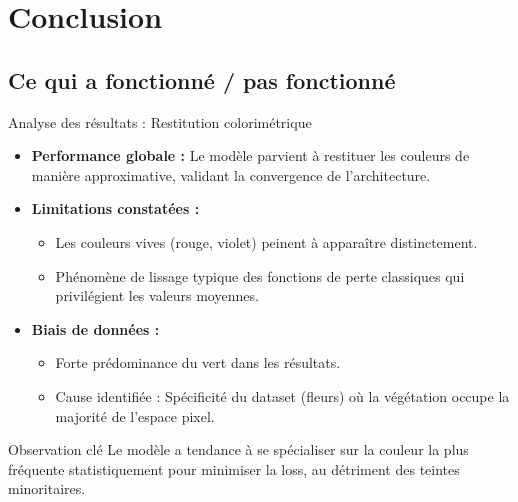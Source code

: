 \documentclass{beamer}
\begin{document}
\section{Conclusion}
\subsection{Ce qui a fonctionné / pas fonctionné}
\begin{frame}{Analyse des résultats : Restitution colorimétrique}
    \begin{itemize}
        \item \textbf{Performance globale :} Le modèle parvient à restituer les couleurs de manière approximative, validant la convergence de l'architecture.
        
        \item \textbf{Limitations constatées :}
        \begin{itemize}
            \item Les couleurs vives (rouge, violet) peinent à apparaître distinctement.
            \item Phénomène de lissage typique des fonctions de perte classiques qui privilégient les valeurs moyennes.
        \end{itemize}
        
        \item \textbf{Biais de données :}
        \begin{itemize}
            \item Forte prédominance du vert dans les résultats.
            \item Cause identifiée : Spécificité du dataset (fleurs) où la végétation occupe la majorité de l'espace pixel.
        \end{itemize}
    \end{itemize}
    
    \begin{alertblock}{Observation clé}
        Le modèle a tendance à se spécialiser sur la couleur la plus fréquente statistiquement pour minimiser la loss, au détriment des teintes minoritaires.
    \end{alertblock}

\end{frame}
\end{document}
